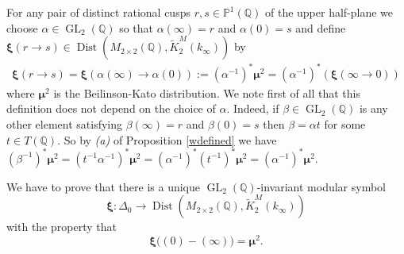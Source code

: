 \documentclass[12pt,amstex,amssymb]{article}
\theoremstyle{plain}
\newcommand{\PP}{\mathbb{P}}
\theoremstyle{definition}
\def\lra{\longrightarrow}
\def\Q{{\mathbb Q}}
\newcommand{\bea}{\begin{eqnarray}}
\newcommand{\eea}{\end{eqnarray}}
\newcommand{\GL}{\operatorname{GL}}
\newcommand{\Dist}{\operatorname{Dist}}
\begin{document}
For any pair of distinct rational cusps $r,s\in \PP^1(\Q)$ of the upper half-plane we choose $\alpha\in \GL_2(\Q)$ so that $\alpha(\infty) = r$ and $\alpha(0) = s$ and define ${\bm\xi}(r\to s) \in \Dist(M_{2\times2}(\Q), \tilde K^M_2(k_\infty))$ by 
\bea \label{BKD}
{\bm\xi}(r\to s)={\bm\xi}( \alpha(\infty)\to \alpha(0)) := (\alpha^{-1})^*{{\bm\mu}^2} =(\alpha^{-1})^* \left( {\bm\xi}(\infty \to 0)\right)
\eea
where ${{\bm\mu}^2}$ is the Beilinson-Kato distribution. We note first of all that this definition does not depend on the choice of $\alpha$.  Indeed, if $\beta \in \GL_2(\Q)$ is any other element satisfying $\beta(\infty) = r$ and $\beta(0) = s$
then $\beta =  \alpha t$ for some $t\in T(\Q)$.  So by \textit{(a)} of Proposition \ref{wdefined} we have $(\beta^{-1})^* {{\bm\mu}^2} = (t^{-1} \alpha^{-1} )^*{{\bm\mu}^2}= (\alpha^{-1})^* ({t^{-1}})^*{{\bm\mu}^2} = (\alpha^{-1})^* {{\bm\mu}^2}$.   


We have to prove that there is a unique $\GL_2(\Q)$-invariant modular symbol
$$
{\bm\xi} : \Delta_0 \lra \Dist(M_{2\times2}(\Q),\tilde K^M_2(k_\infty))
$$
with the property that 
$${\bm\xi}\biggl((0)-(\infty)\biggr) = {{\bm\mu}^2}. $$
\end{document}
